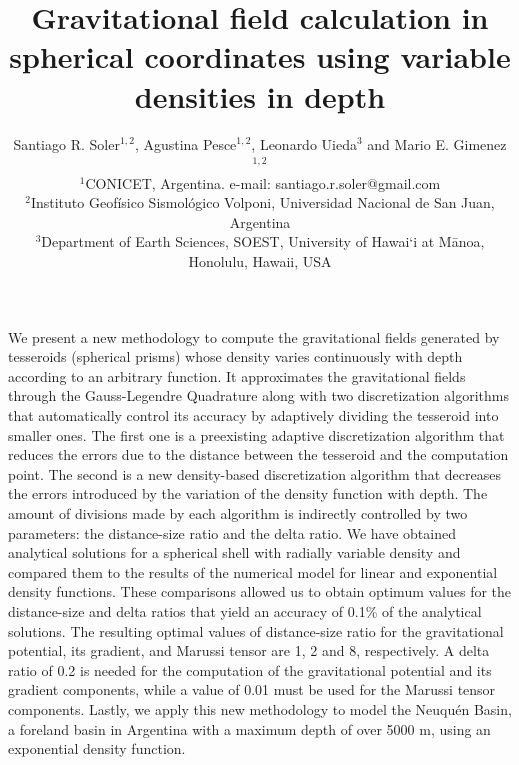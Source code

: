 \documentclass[extra, referee]{gji}
\begin{document}
\title[Variable Density Tesseroids]{
    Gravitational field calculation in spherical coordinates using variable
    densities in depth
}
\author[S.R. Soler, A. Pesce, L. Uieda and M.E. Gimenez]{
    Santiago R. Soler$^{1,2}$, Agustina Pesce$^{1,2}$, Leonardo Uieda$^3$ and
    Mario E. Gimenez$^{1,2}$ \\
    $^1$CONICET, Argentina. e-mail: santiago.r.soler@gmail.com\\
    $^2$Instituto Geofísico Sismológico Volponi, Universidad Nacional de
    San Juan, Argentina\\
    $^3$Department of Earth Sciences, SOEST, University of Hawai‘i at
    M\={a}noa, Honolulu, Hawaii, USA
}


\maketitle

\begin{summary}
We present a new methodology to compute the gravitational fields generated by
tesseroids (spherical prisms) whose density varies continuously with depth according to
an arbitrary function.
It approximates the gravitational fields through the Gauss-Legendre Quadrature along
with two discretization algorithms that automatically control its accuracy by adaptively
dividing the tesseroid into smaller ones.
The first one is a preexisting adaptive discretization algorithm that reduces
the errors due to the distance between the tesseroid and the computation
point.
The second is a new density-based discretization algorithm that
decreases the errors introduced by the variation of the density function with depth.
The amount of divisions made by each algorithm is indirectly controlled
by two parameters: the distance-size ratio and the delta ratio.
We have obtained analytical solutions for a spherical shell with radially variable
density and compared them to the results of the numerical model for linear and
exponential density functions.
These comparisons allowed us to obtain optimum values for the distance-size and
delta ratios that yield an accuracy of 0.1\% of the analytical solutions.
The resulting optimal values of distance-size ratio for the gravitational potential, its
gradient, and Marussi tensor are 1, 2 and 8, respectively.
A delta ratio of 0.2 is needed for the computation of the gravitational potential and
its gradient components, while a value of 0.01 must be used for the Marussi tensor
components.
Lastly, we apply this new methodology to model the Neuqu\'en Basin, a foreland basin in
Argentina with a maximum depth of over 5000 m, using an exponential density function.
\end{summary}
\end{document}
